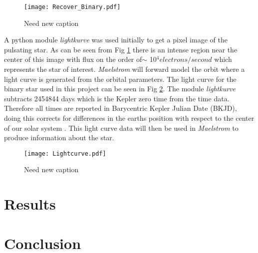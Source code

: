 \documentclass[]{article}
\begin{document}
\begin{figure}[H]
    \centering
    \texttt{[image: Recover\_Binary.pdf]}
      \caption{Need new caption}
      \label{fig:Recover_Binary}
    \end{figure}


A python module \textit{lightkurve} was used initially to get a pixel image of the pulsating star.  As can be seen from Fig \ref{fig:Recover_Binary} there is an intense region near the center of this image with flux on the order of$\sim$ 10$^4 electrons/second$ which represents the star of interest. \textit{Maelstrom} will forward model the orbit where a light curve is generated from the orbital parameters. The light curve for the binary star used in this project can be seen in Fig \ref{fig:Lightcurve}. The module \textit{lightkurve} subtracts 2454844 days which is the Kepler zero time from the time data. Therefore all times are reported in Barycentric Kepler Julian Date (BKJD), doing this corrects for differences in the earths position with respect to the center of our solar system \cite{Eastman_2010}. This light curve data will then be used in \textit{Maelstrom} to produce information about the star.

\begin{figure}[H]
    \centering
    \texttt{[image: Lightcurve.pdf]}
      \caption{Need new caption}
      \label{fig:Lightcurve}
    \end{figure}


\section{Results}




\section{Conclusion}


        

\end{document}
